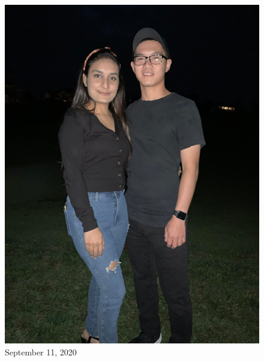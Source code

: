\documentclass[
]{book}
\begin{document}
\begin{figure}
\centering
\includegraphics[width=5.20833in,height=\textheight]{mimages/3 9-11-2020.jpg}
\caption{September 11, 2020}
\end{figure}
\end{document}
